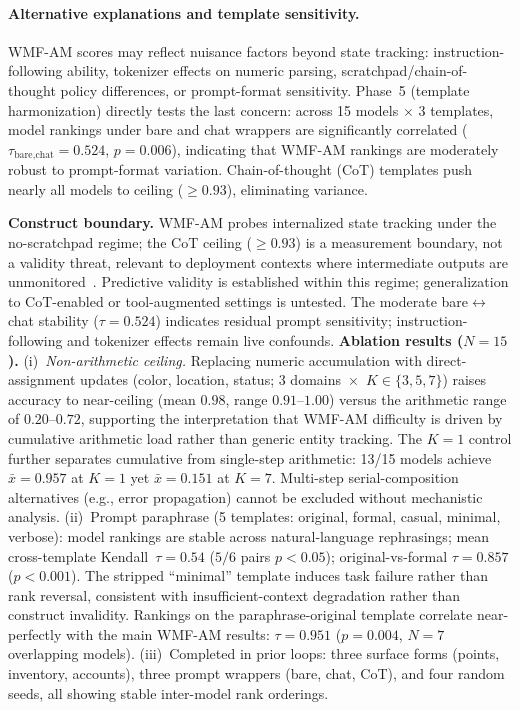 \documentclass{article}
\begin{document}
\paragraph{Alternative explanations and template sensitivity.}
WMF-AM scores may reflect nuisance factors beyond state tracking:
instruction-following ability, tokenizer effects on numeric parsing,
scratchpad/chain-of-thought policy differences, or prompt-format
sensitivity. Phase~5 (template harmonization) directly tests the last
concern: across 15 models $\times$ 3 templates, model rankings under
bare and chat wrappers are significantly correlated
($\tau_{\text{bare,chat}} = 0.524$, $p = 0.006$), indicating that
WMF-AM rankings are moderately robust to prompt-format variation.
Chain-of-thought (CoT) templates push nearly all models to ceiling
($\geq 0.93$), eliminating variance.

\textbf{Construct boundary.}
WMF-AM probes internalized state tracking under the no-scratchpad regime;
the CoT ceiling ($\geq 0.93$) is a measurement boundary, not a validity
threat, relevant to deployment contexts where intermediate outputs are
unmonitored~\citep{nye2021show}.
Predictive validity is established within this regime; generalization to
CoT-enabled or tool-augmented settings is untested.
The moderate bare$\leftrightarrow$chat stability ($\tau = 0.524$)
indicates residual prompt sensitivity; instruction-following and
tokenizer effects remain live confounds.
\textbf{Ablation results ($N{=}15$).}
(i)~\emph{Non-arithmetic ceiling.}
Replacing numeric accumulation with direct-assignment updates
(color, location, status; 3 domains~$\times$~$K\in\{3,5,7\}$)
raises accuracy to near-ceiling (mean $0.98$, range $0.91$--$1.00$)
versus the arithmetic range of $0.20$--$0.72$, supporting the
interpretation that WMF-AM difficulty is driven by cumulative
arithmetic load rather than generic entity tracking.
The $K{=}1$ control further separates cumulative from single-step
arithmetic: 13/15 models achieve $\bar{x}{=}0.957$ at $K{=}1$
yet $\bar{x}{=}0.151$ at $K{=}7$. Multi-step serial-composition
alternatives (e.g., error propagation) cannot be excluded without
mechanistic analysis.
(ii)~Prompt paraphrase
(5 templates: original, formal, casual, minimal, verbose):
model rankings are stable across natural-language rephrasings;
mean cross-template Kendall~$\tau = 0.54$ ($5/6$ pairs $p < 0.05$);
original-vs-formal $\tau = 0.857$ ($p < 0.001$).
The stripped ``minimal'' template induces task failure rather than rank
reversal, consistent with insufficient-context degradation rather
than construct invalidity.
Rankings on the paraphrase-original template correlate
near-perfectly with the main WMF-AM results:
$\tau = 0.951$ ($p = 0.004$, $N{=}7$ overlapping models).
(iii)~Completed in prior loops: three surface forms (points,
inventory, accounts), three prompt wrappers (bare, chat, CoT),
and four random seeds, all showing stable inter-model rank orderings.
\end{document}
